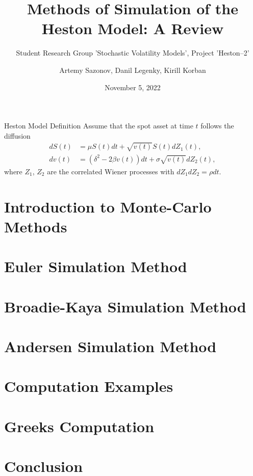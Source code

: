 \documentclass{vegapresentation}
\subtitle{Student Research Group 'Stochastic Volatility Models', Project 'Heston--2'}
\title{Methods of Simulation of the Heston Model: A Review}
\author{Artemy Sazonov, Danil Legenky, Kirill Korban}
\institute{Lomonosov Moscow State Univesity, Faculty of Mechanics and Mathematics}
\date{November 5, 2022}
\begin{document}
    \maketitle

    \begin{frame}{Heston Model Definition}
        Assume that the spot asset at time $t$ follows the diffusion
        \begin{align}
            dS(t) & = \mu S(t)dt + \sqrt{v(t)} S(t) dZ_1(t), \label{Heston:price}\\
            dv(t) & = \left(\delta^2 - 2\beta v(t)\right) dt + \sigma\sqrt{v(t)} dZ_2(t), \label{Heston:variance}
        \end{align}
        where $Z_1$, $Z_2$ are the correlated Wiener processes with $dZ_1dZ_2 = \rho dt$.
    \end{frame}

    
    \section{Introduction to Monte-Carlo Methods}
        

    \section{Euler Simulation Method}
        

    \section{Broadie-Kaya Simulation Method} 
        

    \section{Andersen Simulation Method}
        

    \section{Computation Examples}
        

    \section{Greeks Computation}
        
    
    \section*{Conclusion}
\end{document}
